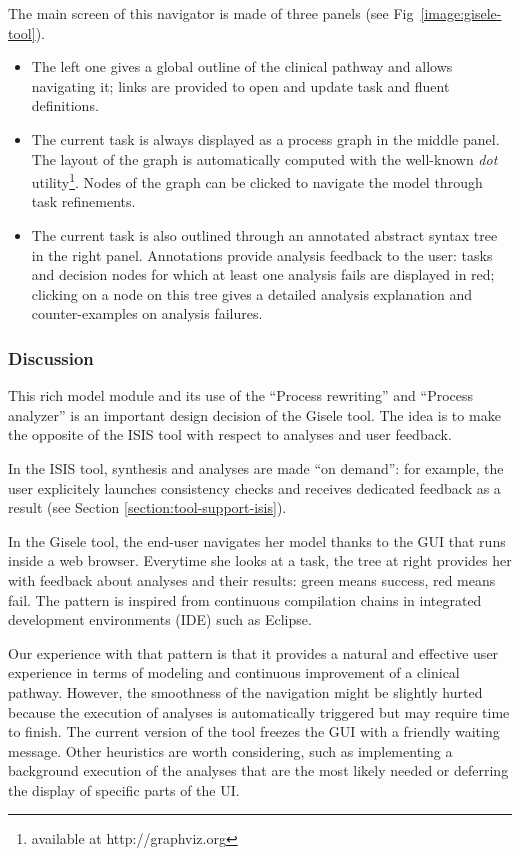 \begin{description}
The main screen of this navigator is made of three panels (see Fig~\ref{image:gisele-tool}). 
\begin{itemize}
\item The left one gives a global outline of the clinical pathway and allows navigating it; links are provided to open and update task and fluent definitions.
\item The current task is always displayed as a process graph in the middle panel. The layout of the graph is automatically computed with the well-known \emph{dot} utility\footnote{available at http://graphviz.org}. Nodes of the graph can be clicked to navigate the model through task refinements.
\item The current task is also outlined through an annotated abstract syntax tree in the right panel. Annotations provide analysis feedback to the user: tasks and decision nodes for which at least one analysis fails are displayed in red; clicking on a node on this tree gives a detailed analysis explanation and counter-examples on analysis failures.
\end{itemize}

\end{description}

\subsubsection*{Discussion}

This rich model module and its use of the ``Process rewriting'' and ``Process analyzer'' is an important design decision of the Gisele tool. The idea is to make the opposite of the ISIS tool with respect to analyses and user feedback. 

In the ISIS tool, synthesis and analyses are made ``on demand'': for example, the user explicitely launches consistency checks and receives dedicated feedback as a result (see Section \ref{section:tool-support-isis}).

In the Gisele tool, the end-user navigates her model thanks to the GUI that runs inside a web browser. Everytime she looks at a task, the tree at right provides her with feedback about analyses and their results: green means success, red means fail. The pattern is inspired from continuous compilation chains in integrated development environments (IDE) such as Eclipse. 

Our experience with that pattern is that it provides a natural and effective user experience in terms of modeling and continuous improvement of a clinical pathway. However, the smoothness of the navigation might be slightly hurted because the execution of analyses is automatically triggered but may require time to finish. The current version of the tool freezes the GUI with a friendly waiting message. Other heuristics are worth considering, such as implementing a background execution of the analyses that are the most likely needed or deferring the display of specific parts of the UI.
